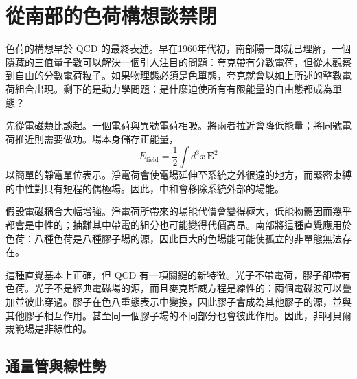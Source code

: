\begin{classroomqa}
\end{classroomqa}

\begin{classroomqa}
\end{classroomqa}

\section{從南部的色荷構想談禁閉}

色荷的構想早於 QCD 的最終表述。早在1960年代初，南部陽一郎就已理解，一個隱藏的三值量子數可以解決一個引人注目的問題：夸克帶有分數電荷，但從未觀察到自由的分數電荷粒子。如果物理態必須是色單態，夸克就會以如上所述的整數電荷組合出現。剩下的是動力學問題：是什麼迫使所有有限能量的自由態都成為單態？

先從電磁類比談起。一個電荷與異號電荷相吸。將兩者拉近會降低能量；將同號電荷推近則需要做功。場本身儲存正能量，
\begin{equation}
E_{\mathrm{field}}
=\frac12\int d^3x\,\boldsymbol E^2
\end{equation}
以簡單的靜電單位表示。淨電荷會使電場延伸至系統之外很遠的地方，而緊密束縛的中性對只有短程的偶極場。因此，中和會移除系統外部的場能。

假設電磁耦合大幅增強。淨電荷所帶來的場能代價會變得極大，低能物體因而幾乎都會是中性的；抽離其中帶電的組分也可能變得代價高昂。南部將這種直覺應用於色荷：八種色荷是八種膠子場的源，因此巨大的色場能可能使孤立的非單態無法存在。

這種直覺基本上正確，但 QCD 有一項關鍵的新特徵。光子不帶電荷，膠子卻帶有色荷。光子不是經典電磁場的源，而且麥克斯威方程是線性的：兩個電磁波可以疊加並彼此穿過。膠子在色八重態表示中變換，因此膠子會成為其他膠子的源，並與其他膠子相互作用。甚至同一個膠子場的不同部分也會彼此作用。因此，非阿貝爾規範場是非線性的。

\subsection{通量管與線性勢}

